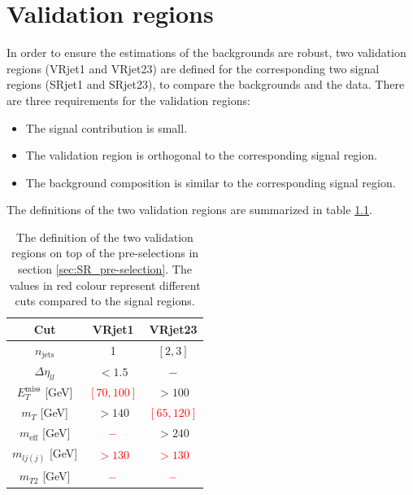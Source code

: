 \chapter{Validation regions}
\label{ch:VR}

In order to ensure the estimations of the backgrounds are robust, two validation regions (VRjet1 and VRjet23) are defined for the corresponding two signal regions (SRjet1 and SRjet23), to compare the backgrounds and the data.
There are three requirements for the validation regions:
\begin{itemize}
\item The signal contribution is small.
\item The validation region is orthogonal to the corresponding signal region.
\item The background composition is similar to the corresponding signal region.
\end{itemize}
The definitions of the two validation regions are summarized in table \ref{tab:VR_cuts}.

\begin{table}[htbp]
\begin{center}
\begin{tabular}{|c|c|c|}
\hline
Cut & VRjet1 & VRjet23 \\
\hline
\hline
$n_{\text{jets}}$               & 1                             & $[2,3]$ \\
$\Delta \eta_{ll}$              & $<1.5$                        & $-$ \\
$E_T^{\text{miss}}$ [GeV]       & \textcolor{red}{ $[70,100]$ } & $>100$ \\
$m_T$ [GeV]                     & $>140$                        & \textcolor{red}{$[65,120]$} \\
$m_{\text{eff}}$ [GeV]          & $\textcolor{red}{-}$          & $>240$ \\
$m_{lj(j)}$ [GeV]               & \textcolor{red}{$>130$}       & \textcolor{red}{$>130$} \\
$m_{T2}$ [GeV]                  & $\textcolor{red}{-}$          & $\textcolor{red}{-}$ \\
\hline
\end{tabular}
\caption{The definition of the two validation regions on top of the pre-selections in section \ref{sec:SR_pre-selection}. The values in red colour represent different cuts compared to the signal regions.}
\label{tab:VR_cuts}
\end{center}
\end{table}

